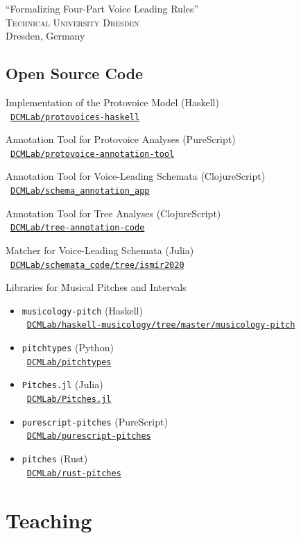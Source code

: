 \documentclass[10pt]{scrartcl}
\newcommand{\margintext}[1]{\marginpar{\raggedleft\itshape\small#1}}
\newcommand{\entry}[1]{\vphantom{x}\margintext{#1}}
\begin{document}
\entry{2017}%
\invited \enquote{Formalizing Four-Part Voice Leading Rules}
\\
\textsc{Technical University Dresden}\\
Dresden, Germany

\subsection*{Open Source Code}

\newcommand{\codelink}[1]{\faCodeFork\ \href{https://#1}{\nolinkurl{#1}}}
\newcommand{\ghlink}[1]{\faGithub\ \href{https://github.com/#1}{\nolinkurl{#1}}}

Implementation of the Protovoice Model (Haskell)\\
\ghlink{DCMLab/protovoices-haskell}

Annotation Tool for Protovoice Analyses (PureScript)\\
\ghlink{DCMLab/protovoice-annotation-tool}

Annotation Tool for Voice-Leading Schemata (ClojureScript)\\
\ghlink{DCMLab/schema_annotation_app}

Annotation Tool for Tree Analyses (ClojureScript)\\
\ghlink{DCMLab/tree-annotation-code}

Matcher for Voice-Leading Schemata (Julia)\\
\ghlink{DCMLab/schemata_code/tree/ismir2020}

Libraries for Musical Pitches and Intervals
\begin{itemize}
\item \texttt{musicology-pitch} (Haskell)\\
  \ghlink{DCMLab/haskell-musicology/tree/master/musicology-pitch}
\item \texttt{pitchtypes} (Python)\\
  \ghlink{DCMLab/pitchtypes}
\item \texttt{Pitches.jl} (Julia)\\
  \ghlink{DCMLab/Pitches.jl}
\item \texttt{purescript-pitches} (PureScript)\\
  \ghlink{DCMLab/purescript-pitches}
\item \texttt{pitches} (Rust)\\
  \ghlink{DCMLab/rust-pitches}
\end{itemize}

\section*{Teaching}
\end{document}
